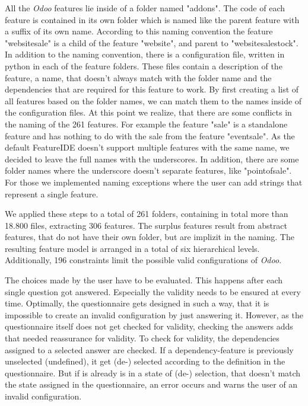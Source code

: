 All the \textit{Odoo} features lie inside of a folder named "addons". The code of each feature is contained in its own folder which is named like the parent feature with a suffix of its own name. According to this naming convention the feature "website\textunderscore sale" is a child of the feature "website", and parent to "website\textunderscore sale\textunderscore stock". In addition to the naming convention, there is a configuration file, written in python in each of the feature folders. These files contain a description of the feature, a name, that doesn't always match with the folder name and the dependencies that are required for this feature to work.
By first creating a list of all features based on the folder names, we can match them to the names inside of the configuration files. At this point we realize, that there are some conflicts in the naming of the 261 features. For example the feature "sale" is a standalone feature and has nothing to do with the sale from the feature "event\textunderscore sale". As the default FeatureIDE doesn't support multiple features with the same name, we decided to leave the full names with the underscores. In addition, there are some folder names where the underscore doesn't separate features, like "point\textunderscore of\textunderscore sale". For those we implemented naming exceptions where the user can add strings that represent a single feature.

We applied these steps to a total of 261 folders, containing in total more than 18.800 files, extracting 306 features. The surplus features result from abstract features, that do not have their own folder, but are implizit in the naming. The resulting feature model is arranged in a total of six hierarchical levels. Additionally, 196 constraints limit the possible valid configurations of \textit{Odoo}.

The choices made by the user have to be evaluated. This happens after each single question got answered. Especially the validity needs to be ensured at every time. Optimally, the questionnaire gets designed in such a way, that it is impossible to create an invalid configuration by just answering it. However, as the questionnaire itself does not get checked for validity, checking the answers adds that needed reassurance for validity. To check for validity, the dependencies assigned to a selected answer are checked. If a dependency-feature is previously unselected (undefined), it get (de-) selected according to the definition in the questionnaire. But if is already is in a state of (de-) selection, that doesn't match the state assigned in the questionnaire, an error occurs and warns the user of an invalid configuration.

